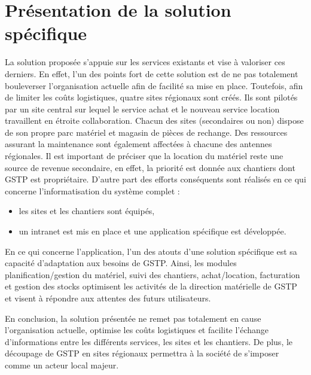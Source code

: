 \section{Présentation de la solution spécifique}
La solution proposée s’appuie sur les services existants et vise à valoriser ces derniers. 
En effet, l’un des points fort de cette solution est de ne pas totalement bouleverser l’organisation actuelle afin de facilité sa mise en place.
Toutefois, afin de limiter les coûts logistiques, quatre sites régionaux sont créés. Ils sont pilotés par un site central sur lequel le service achat et le nouveau service location travaillent en étroite collaboration. Chacun des sites (secondaires ou non) dispose de son propre parc matériel et magasin de pièces de rechange. Des ressources assurant la maintenance sont également affectées à chacune des antennes régionales. 
Il est important de préciser que la location du matériel reste une source de revenue secondaire, en effet, la priorité est donnée aux chantiers dont GSTP est propriétaire.
D’autre part des efforts conséquents sont réalisés en ce qui concerne l’informatisation du système complet :
    \begin{itemize}
        \item les sites et les chantiers sont équipés,
        \item un intranet est mis en place et une application spécifique est développée.
    \end{itemize}

En ce qui concerne l’application, l’un des atouts d’une solution spécifique est sa capacité d’adaptation aux besoins de GSTP. 
Ainsi, les modules planification/gestion du matériel, suivi des chantiers, achat/location, facturation et gestion des stocks optimisent les activités de la direction matérielle de GSTP et visent à répondre aux attentes des futurs utilisateurs.

En conclusion, la solution présentée ne remet pas totalement en cause l’organisation actuelle, optimise les coûts logistiques et facilite l’échange d’informations entre les différents services, les sites et les chantiers. 
De plus, le découpage de GSTP en sites régionaux permettra à la société de s’imposer comme un acteur local majeur.


